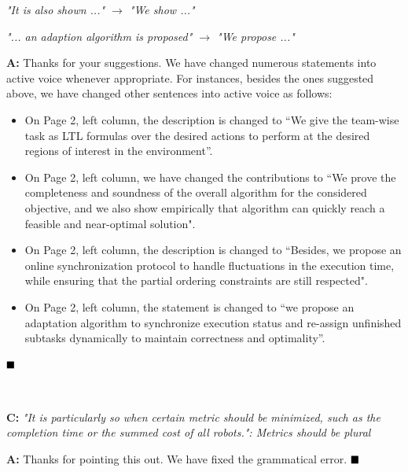 \documentclass[10pt]{article}
\begin{document}
\emph{ "It is also shown ..." $\rightarrow$ "We show ..."
}

\emph{ "... an adaption algorithm is proposed" $\rightarrow$ "We propose ..."
}

\textbf{A:} Thanks for your suggestions.
We have changed numerous statements into active voice whenever appropriate.
For instances,
besides the ones suggested above, we have changed other sentences into active voice as follows:
\begin{itemize}
\item On Page 2,  left column, the description
is changed to ``We give the team-wise task as LTL formulas over the desired
actions to perform at the desired regions of interest in the environment''.

\item On Page 2,  left column, we have changed the contributions to
``We prove the completeness and soundness of the overall algorithm for the considered objective,
and we also show empirically that algorithm can quickly reach a feasible and near-optimal solution".

\item On Page 2,  left column,  the description is changed to ``Besides,
we propose an online synchronization protocol to handle fluctuations in the execution time,
while ensuring that the partial ordering constraints are still respected".


\item On Page 2,  left column,  the statement is changed to
``we propose an adaptation algorithm to synchronize execution status and re-assign unfinished subtasks dynamically to maintain correctness and optimality''.
\end{itemize}

$\hfill\blacksquare$



\hspace*{\fill} \




\textbf{C:}
\emph{ "It is particularly so when certain metric should be minimized, such as the completion time or
	the summed cost of all robots.": Metrics should be plural}

\textbf{A:} Thanks for pointing this out. We have fixed the grammatical error.
$\hfill\blacksquare$

\hspace*{\fill} \
\end{document}
